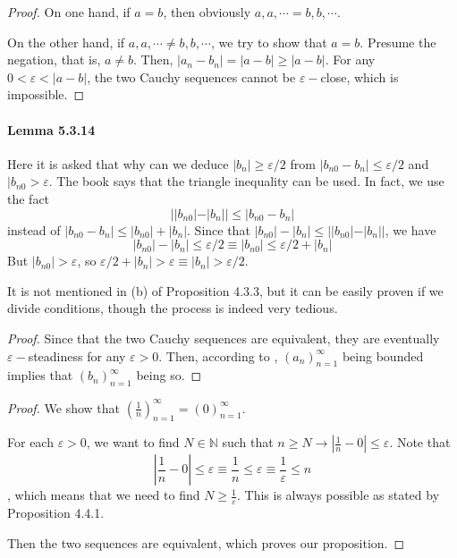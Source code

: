 \begin{proof}
On one hand, if $a=b$, then obviously $a,a,\cdots = b,b,\cdots$. 

On the other hand, if $a,a,\cdots \neq b,b,\cdots$, we try to show that $a=b$. Presume the negation, that is, 
$a \neq b$. Then, $|a_n-b_n| = |a-b| \geq |a-b|$. For any $0<\varepsilon< |a-b|$, the two Cauchy sequences cannot be 
$\varepsilon-$close, which is impossible.
\end{proof}

\paragraph{Lemma 5.3.14}
Here it is asked that why can we deduce $|b_n| \geq \varepsilon/2$ from $|b_{n0} - b_n| \leq \varepsilon/2$ and 
$|b_{n0} > \varepsilon$. The book says that the triangle inequality can be used. In fact, we use the fact 
\[
||b_{n0}| - |b_n|| \leq |b_{n0} - b_n|
\]
instead of $|b_{n0} - b_n| \leq |b_{n0}| + |b_n|$. Since that $|b_{n0}| - |b_n| \leq ||b_{n0}| - |b_n||$, 
we have 
\[
|b_{n0}| - |b_n| \leq \varepsilon/2 \equiv |b_{n0}| \leq \varepsilon/2 + |b_n|
\]
But $|b_{n0}| > \varepsilon$, so $\varepsilon/2 + |b_n| > \varepsilon \equiv |b_n| > \varepsilon/2$.

It is not mentioned in (b) of Proposition 4.3.3, but it can be easily proven if we divide conditions, though 
the process is indeed very tedious.

\begin{proof}
Since that the two Cauchy sequences are equivalent, they are eventually $\varepsilon-$steadiness for any $\varepsilon>0$. 
Then, according to , $(a_n)^\infty_{n=1}$ being bounded implies that $(b_n)^\infty_{n=1}$ being so.
\end{proof}

\begin{proof}
We show that $(\frac{1}{n})^\infty_{n=1} = (0)^\infty_{n=1}$.

For each $\varepsilon>0$, we want to find $N \in \mathbb{N}$ such that 
$n\geq N \longrightarrow |\frac{1}{n}-0|\leq \varepsilon$. Note that 
\[
|\frac{1}{n}-0|\leq \varepsilon \equiv \frac{1}{n} \leq \varepsilon \equiv \frac{1}{\varepsilon} \leq n
\], 
which means that we need to find $N \geq \frac{1}{\varepsilon}$. This is always possible as stated by Proposition 4.4.1.

Then the two sequences are equivalent, which proves our proposition.
\end{proof}

